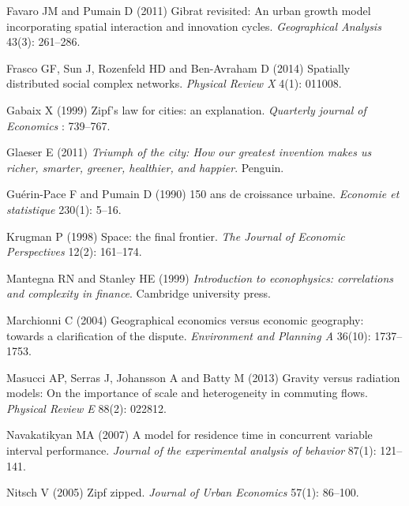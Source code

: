 \documentclass[Royal,sageh,times]{sagej}
\begin{document}
\begin{thebibliography}{51}
Favaro JM and Pumain D (2011) Gibrat revisited: An urban growth model
  incorporating spatial interaction and innovation cycles.
\newblock \emph{Geographical Analysis} 43(3): 261--286.

Frasco GF, Sun J, Rozenfeld HD and Ben-Avraham D (2014) Spatially distributed
  social complex networks.
\newblock \emph{Physical Review X} 4(1): 011008.

Gabaix X (1999) Zipf's law for cities: an explanation.
\newblock \emph{Quarterly journal of Economics} : 739--767.

Glaeser E (2011) \emph{Triumph of the city: How our greatest invention makes us
  richer, smarter, greener, healthier, and happier}.
\newblock Penguin.

Gu{\'e}rin-Pace F and Pumain D (1990) 150 ans de croissance urbaine.
\newblock \emph{Economie et statistique} 230(1): 5--16.

Krugman P (1998) Space: the final frontier.
\newblock \emph{The Journal of Economic Perspectives} 12(2): 161--174.

Mantegna RN and Stanley HE (1999) \emph{Introduction to econophysics:
  correlations and complexity in finance}.
\newblock Cambridge university press.

Marchionni C (2004) Geographical economics versus economic geography: towards a
  clarification of the dispute.
\newblock \emph{Environment and Planning A} 36(10): 1737--1753.

Masucci AP, Serras J, Johansson A and Batty M (2013) Gravity versus radiation
  models: On the importance of scale and heterogeneity in commuting flows.
\newblock \emph{Physical Review E} 88(2): 022812.

Navakatikyan MA (2007) A model for residence time in concurrent variable
  interval performance.
\newblock \emph{Journal of the experimental analysis of behavior} 87(1):
  121--141.

Nitsch V (2005) Zipf zipped.
\newblock \emph{Journal of Urban Economics} 57(1): 86--100.


\end{thebibliography}
\end{document}
